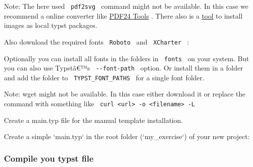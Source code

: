 Note: The here used \texttt{\ pdf2svg\ } command might not be available.
In this case we recommend a online converter like
\href{https://tools.pdf24.org/en/pdf-to-svg}{PDF24 Tools} . There also
is a \href{https://github.com/FussballAndy/typst-img-to-local}{tool} to
install images as local typst packages.

Also download the required fonts \texttt{\ Roboto\ } and
\texttt{\ XCharter\ } :

\begin{Shaded}
\begin{Highlighting}[]
\end{Highlighting}
\end{Shaded}

Optionally you can install all fonts in the folders in
\texttt{\ fonts\ } on your system. But you can also use Typstâ€™s
\texttt{\ -\/-font-path\ } option. Or install them in a folder and add
the folder to \texttt{\ TYPST\_FONT\_PATHS\ } for a single font folder.

Note: wget might not be available. In this case either download it or
replace the command with something like
\texttt{\ curl\ \textless{}url\textgreater{}\ -o\ \textless{}filename\textgreater{}\ -L\ }

Create a main.typ file for the manual template installation.

Create a simple `main.typ` in the root folder (`my\_exercise`) of your
new project:

\begin{Shaded}
\begin{Highlighting}[]

\NormalTok{  ),}
\NormalTok{)}

\end{Highlighting}
\end{Shaded}

\subsubsection{Compile you typst file}\label{compile-you-typst-file}

